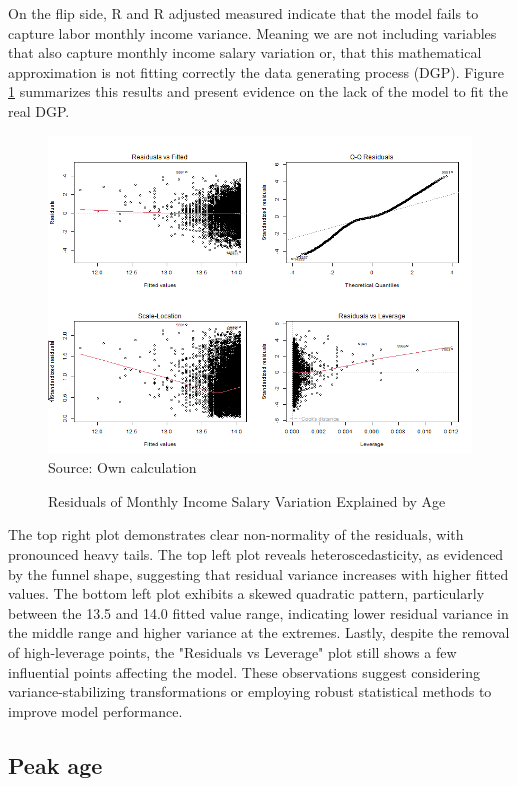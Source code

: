 \documentclass[a4paper,12pt]{article}
\begin{document}
On the flip side, R and R adjusted measured indicate that the model fails to capture labor monthly income variance. Meaning we are not including variables that also capture monthly income salary variation or, that this mathematical approximation is not fitting correctly the data generating process (DGP). Figure \ref{fig:Residuales3} summarizes this results and present evidence on the lack of the model to fit the real DGP. 


\begin{figure}[H]
    \centering
    \caption{Residuals of Monthly Income Salary Variation Explained by Age}
    \includegraphics[width=\textwidth]{3.1 Salary vs Age.png}
    \label{fig:Residuales3}
    \scriptsize
    Source: Own calculation 
    \tiny
\end{figure}
The top right plot demonstrates clear non-normality of the residuals, with pronounced heavy tails. The top left plot reveals heteroscedasticity, as evidenced by the funnel shape, suggesting that residual variance increases with higher fitted values. The bottom left plot exhibits a skewed quadratic pattern, particularly between the 13.5 and 14.0 fitted value range, indicating lower residual variance in the middle range and higher variance at the extremes. Lastly, despite the removal of high-leverage points, the "Residuals vs Leverage" plot still shows a few influential points affecting the model. These observations suggest considering variance-stabilizing transformations or employing robust statistical methods to improve model performance.

\subsection{Peak age}
\end{document}
